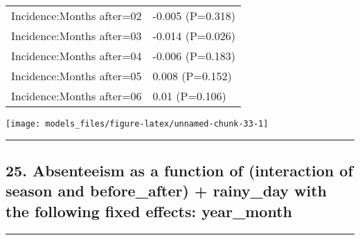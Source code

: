 \documentclass[]{article}
\begin{document}
\begin{longtable}[t]{ll}
\hspace{1em}Incidence:Months after=02 & -0.005 (P=0.318)\\
\hspace{1em}Incidence:Months after=03 & -0.014 (P=0.026)\\
\hspace{1em}Incidence:Months after=04 & -0.006 (P=0.183)\\
\hspace{1em}Incidence:Months after=05 & 0.008 (P=0.152)\\
\hspace{1em}Incidence:Months after=06 & 0.01 (P=0.106)\\*
\end{longtable}

\begin{center}\texttt{[image: models\_files/figure-latex/unnamed-chunk-33-1]} \end{center}

\newpage

\begin{center}\rule{0.5\linewidth}{\linethickness}\end{center}

\subsection{25. Absenteeism as a function of (interaction of season and
before\_after) + rainy\_day with the following fixed effects:
year\_month}\label{absenteeism-as-a-function-of-interaction-of-season-and-before_after-rainy_day-with-the-following-fixed-effects-year_month}

\begin{center}\rule{0.5\linewidth}{\linethickness}\end{center}
\end{document}
